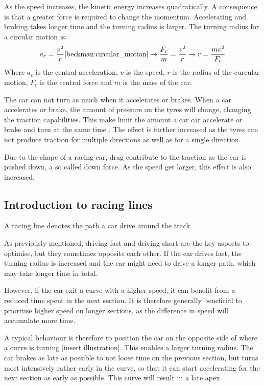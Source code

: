 As the speed increases, the kinetic energy increases quadratically. A consequence is that a greater force is required to change the momentum. Accelerating and braking takes longer time and the turning radius is larger. The turning radius for a circular motion is:
\begin{equation}
a_c = \frac{v^2}{r} \cite{beckman:circular_motion} 
\rightarrow
\frac{F_c}{m} = \frac{v^2}{r} 
\rightarrow
r = \frac{mv^2}{F_c}
\end{equation}
Where $a_c$ is the central acceleration, $v$ is the speed, $r$ is the radius of the curcular motion, $F_c$ is the central force and $m$ is the mass of the car.

The car can not turn as much when it accelerates or brakes. When a car accelerates or brake, the amount of pressure on the tyres will change, changing the traction capabilities. This make limit the amount a car car accelerate or brake and turn at the same time \cite{beckman:weight_transfer}. The effect is further increased as the tyres can not produce traction for multiple directions as well as for a single direction\cite{beckman:traction_budget}. 

Due to the shape of a racing car, drag contribute to the traction as the car is pushed down, a so called down force. As the speed get larger, this effect is also increased.


\subsection{Introduction to racing lines}
A racing line denotes the path a car drive around the track.

As previously mentioned, driving fast and driving short are the key aspects to optimise, but they sometimes opposite each other. If the car drives fast, the turning radius is increased and the car might need to drive a longer path, which may take longer time in total. 

However, if the car exit a curve with a higher speed, it can benefit from a reduced time spent in the next section. It is therefore generally beneficial to prioritise higher speed on longer sections\cite{beckman:racing_line_intro}, as the difference in speed will accumulate more time.

A typical behaviour is therefore to position the car on the opposite side of where a curve is turning [insert illustration]. This enables a larger turning radius. The car brakes as late as possible to not loose time on the previous section, but turns most intensively rather early in the curve, so that it can start accelerating for the next section as early as possible. This curve will result in a late apex.

